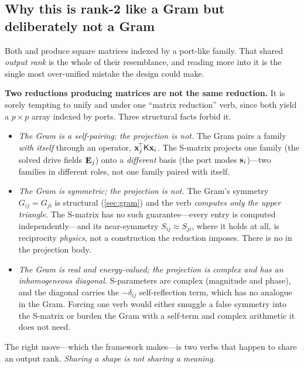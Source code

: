 \subsection{Why this is rank-2 like a Gram but deliberately not a Gram}

Both  and  produce square matrices
indexed by a port-like family. That shared \emph{output rank} is the whole of
their resemblance, and reading more into it is the single most over-unified
mistake the design could make.

\begin{pitfall}
\label{pit:gram-not-proj}
\textbf{Two reductions producing matrices are not the same reduction.} It is
sorely tempting to unify  and  under
one ``matrix reduction'' verb, since both yield a $p\times p$ array indexed by
ports. Three structural facts forbid it.
\begin{itemize}[nosep]
  \item \emph{The Gram is a self-pairing; the projection is not.} The Gram pairs
  a family \emph{with itself} through an operator, $\mathbf{x}_j^{\!\top}\mathsf{K}\mathbf{x}_i$. The
  S-matrix projects one family (the solved drive fields $\mathbf{E}_j$) onto a
  \emph{different} basis (the port modes $\mathbf{s}_i$)---two families in different
  roles, not one family paired with itself.
  \item \emph{The Gram is symmetric; the projection is not.} The Gram's symmetry
  $G_{ij}=G_{ji}$ is structural (\cref{sec:gram}) and the verb \emph{computes
  only the upper triangle}. The S-matrix has no such guarantee---every entry is
  computed independently---and its near-symmetry $S_{ij}\approx S_{ji}$, where it
  holds at all, is reciprocity \emph{physics}, not a construction the reduction
  imposes. There is no  in the projection body.
  \item \emph{The Gram is real and energy-valued; the projection is complex and
  has an inhomogeneous diagonal.} S-parameters are complex (magnitude and phase),
  and the diagonal carries the $-\delta_{ij}$ self-reflection term, which has no
  analogue in the Gram. Forcing one verb would either smuggle a false symmetry
  into the S-matrix or burden the Gram with a self-term and complex arithmetic it
  does not need.
\end{itemize}
The right move---which the framework makes---is two verbs that happen to share an
output rank. \emph{Sharing a shape is not sharing a meaning.}
\end{pitfall}

